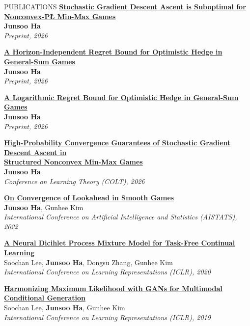 \documentclass{resume} %
\begin{document}
\begin{rSection}{PUBLICATIONS}
	{\bf \href{https://arxiv.org/abs/2610.07814}{Stochastic Gradient Descent Ascent is Suboptimal for Nonconvex-PŁ Min-Max Games}} \\
	{\bf Junsoo Ha} \\
	{\em Preprint, 2026}

	{\bf \href{https://arxiv.org/abs/2609.22839}{A Horizon-Independent Regret Bound for Optimistic Hedge in General-Sum Games}} \\
	{\bf Junsoo Ha} \\
	{\em Preprint, 2026}

	{\bf \href{https://arxiv.org/abs/2609.19677}{A Logarithmic Regret Bound for Optimistic Hedge in General-Sum Games}} \\
	{\bf Junsoo Ha} \\
	{\em Preprint, 2026}

	{\bf \href{https://proceedings.mlr.press/v336/ha26a.html}{High-Probability Convergence Guarantees of Stochastic Gradient Descent Ascent in \\
	Structured Nonconvex Min-Max Games}} \\
	{\bf Junsoo Ha} \\
	{\em Conference on Learning Theory (COLT), 2026}
	
	{\bf \href{https://proceedings.mlr.press/v151/ha22a.html}{On Convergence of Lookahead in Smooth Games}} \\
	{\bf Junsoo Ha}, Gunhee Kim \\
	{\em International Conference on Artificial Intelligence and Statistics (AISTATS), 2022}
	
	{\bf \href{https://openreview.net/forum?id=SJxSOJStPr}{A Neural Dicihlet Process Mixture Model for Task-Free Continual Learning}} \\ 
	Soochan Lee, {\bf Junsoo Ha}, Dongsu Zhang, Gunhee Kim \\
	{\em International Conference on Learning Representations (ICLR), 2020}
	
	
	{\bf \href{https://openreview.net/forum?id=HJxyAjRcFX}{Harmonizing Maximum Likelihood with GANs for Multimodal Conditional Generation}} \\ 
	Soochan Lee, {\bf Junsoo Ha}, Gunhee Kim \\
	{\em International Conference on Learning Representations (ICLR), 2019}
\end{rSection}

\end{document}
